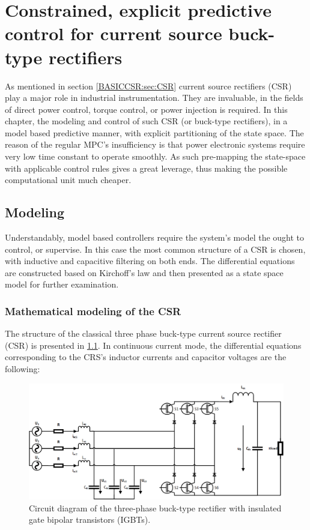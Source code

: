 \chapter[Predictive control of a CSR]{Constrained, explicit predictive control for current source buck-type rectifiers}\label{EMPC:sec:main}

As mentioned in section \ref{BASICCSR:sec:CSR} current source rectifiers (CSR) play a major role in industrial instrumentation. They are invaluable, in the fields of direct power control, torque control, or power injection is required. In this chapter, the modeling and control of such CSR (or buck-type rectifiers), in a model based predictive manner, with explicit partitioning of the state space. The reason of the regular MPC's insufficiency is that power electronic systems require very low time constant to operate smoothly. As such pre-mapping the state-space with applicable control rules gives a great leverage, thus making the possible computational unit much cheaper.
		
\section{Modeling}\label{EMPC:sec:Modeling}

Understandably, model based controllers require the system's model the ought to control, or supervise. In this case the most common structure of a CSR is chosen, with inductive and capacitive filtering on both ends. The differential equations are constructed based on Kirchoff's law and then presented as a state space model for further examination.

\subsection{Mathematical modeling of the CSR}\label{EMPC:sec:ModelofCSR}

    The structure of the classical three phase buck-type current source rectifier (CSR) is presented in \ref{EMPC:fig:network}. In continuous current mode, the differential equations corresponding to the CRS’s inductor currents and capacitor voltages are the following:

    \begin{figure}[!ht]
        \centering
        \includegraphics[width=\textwidth]{EMPC_PNG_Pics/circuit.png}
        \caption{Circuit diagram of the three-phase buck-type rectifier with insulated gate bipolar transistors (IGBTs).}
        \label{EMPC:fig:network}
    \end{figure}
		

